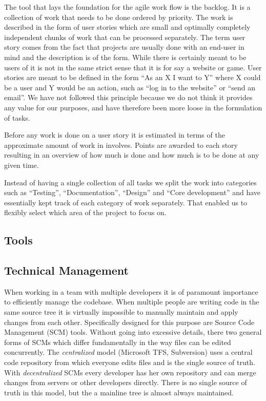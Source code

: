 The tool that lays the foundation for the agile work flow is the backlog. It is
a collection of work that needs to be done ordered by priority. The work is
described in the form of user stories which are small and optimally completely
independent chunks of work that can be processed separately. The term user story
comes from the fact that projects are usually done with an end-user in mind and
the description is of the form. While there is certainly meant to be users of
\thename{} it is not in the same strict sense that it is for say a website or
game. User stories are meant to be defined in the form ``As an X I want to Y''
where X could be a user and Y would be an action, such as ``log in to the
website'' or ``send an email''. We have not followed this principle because we
do not think it provides any value for our purposes, and have therefore been
more loose in the formulation of tasks.

Before any work is done on a user story it is estimated in terms of the
approximate amount of work in involves. Points are awarded to each story
resulting in an overview of how much is done and how much is to be done at any
given time.

Instead of having a single collection of all tasks we split the work into
categories such as ``Testing'', ``Documentation'', ``Design'' and ``Core
development'' and have essentially kept track of each category of work
separately. That enabled us to flexibly select which area of the project to
focus on.

\subsection{Tools}
\label{sec:project-mgmt:tools}

\subsection{Technical Management}

When working in a team with multiple developers it is of paramount importance to
efficiently manage the codebase. When multiple people are writing code in the
same source tree it is virtually impossible to manually maintain and apply
changes from each other. Specifically designed for this purpose are Source Code
Management (SCM) tools. Without going into excessive details, there two general
forms of SCMs which differ fundamentally in the way files can be edited
concurrently. The \textit{centralized} model (Microsoft TFS, Subversion) uses a
central code repository from which everyone edits files and is the single source
of truth. With \textit{decentralized} SCMs every developer has her own
repository and can merge changes from servers or other developers
directly. There is no single source of truth in this model, but the a mainline
tree is almost always maintained.


